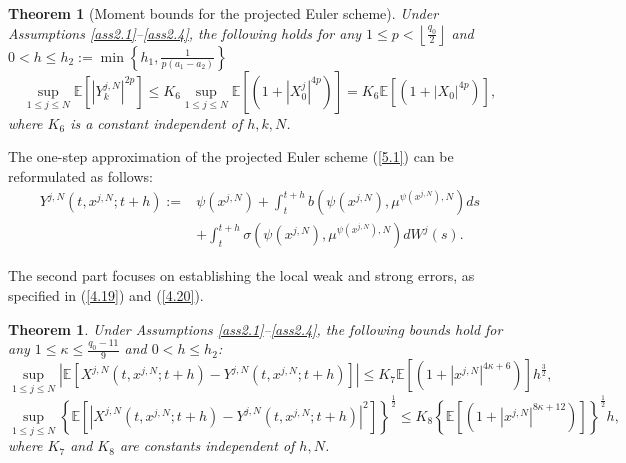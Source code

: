 \documentclass[12pt]{article}
\numberwithin{equation}{section}
\newtheorem{theorem}[assumption]{Theorem}   %
\begin{document}
\begin{theorem}[Moment bounds for the projected Euler scheme]\label{momentboundsforPEM}
Under Assumptions \ref{ass2.1}--\ref{ass2.4}, the following holds for any $1 \leq p < \left\lfloor \frac{q_0}{2} \right\rfloor$ and $0<h \leq h_2:=\min \left\{h_1, \tfrac{1}{p\left(a_1-a_2\right)}\right\}$ %
\begin{equation}\tag{3.19}\label{5.16}
\underset{1\leqslant j\leqslant N}{\sup}\mathbb{E}\left[\left|Y^{j,N}_k\right|^{2 p}\right] \leq K_6 \underset{1\leqslant j\leqslant N}{\sup}\mathbb{E}\left[\left(1+\left|X_0^{j}\right|^{4 p}\right)\right]= K_6\mathbb{E}\left[\left(1+\left|X_0\right|^{4 p}\right)\right],
\end{equation}
where $K_{6}$ is a constant independent of $h, k, N$.
\end{theorem}

The  one-step approximation of the projected Euler scheme (\ref{5.1}) can be reformulated as follows:
\begin{equation}\tag{3.20}\label{5.63}
\begin{aligned}
Y^{j,N}\left( t,x^{j,N};t+h \right) :=&\psi\left(x^{j,N}\right)+\int_t^{t+h}{b\left( \psi\left(x^{j,N}\right),\mu ^{\psi\left(x^{j,N}\right),N} \right)}ds\\
&+\int_t^{t+h}{\sigma \left( \psi\left(x^{j,N}\right),\mu ^{\psi\left(x^{j,N}\right),N} \right)}dW^j\left( s \right). 
\end{aligned}
\end{equation}

The second part focuses on establishing the local weak and strong errors, as specified in (\ref{4.19}) and (\ref{4.20}).

\begin{theorem}\label{theorem5.7}
Under Assumptions \ref{ass2.1}--\ref{ass2.4}, the following bounds hold for any $1\leq \kappa \leq \tfrac{q_0-11}{9}$ and $0<h \leq h_2$:
\begin{equation}\tag{3.21}\label{5.85}
\underset{1\leqslant j\leqslant N}{\sup}\left|\mathbb{E}\left[X^{j,N}\left(t, x^{j,N} ; t+h\right)-Y^{j,N}\left(t, x^{j,N} ; t+h\right)\right]\right|  \leq K_{7}\mathbb{E}\left[\left(1+\left|x^{j,N}\right|^{ 4\kappa+6}\right)\right] h^{\frac{3}{2}},
\end{equation}
    \begin{equation}\tag{3.22}\label{5.86}
    \underset{1\leqslant j\leqslant N}{\sup} \left\{\mathbb{E}\left[\left|X^{j,N}\left(t, x^{j,N} ; t+h\right)-Y^{j,N}\left(t, x^{j,N} ; t+h\right)\right|^{2}\right]\right\}^{\frac{1}{2}} \leq K_{8}\left\{\mathbb{E}\left[\left(1+\left|x^{j,N}\right|^{8\kappa+12 }\right)\right]\right\}^{\frac{1}{2}} h,
    \end{equation}
    where $K_{7}$ and $K_{8}$ are constants independent of $h, N$.
\end{theorem} 
\end{document}
